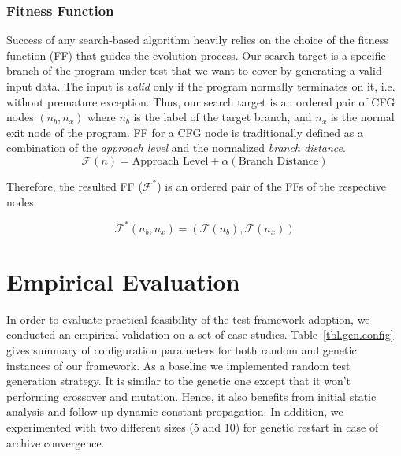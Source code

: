 \documentclass[sigconf]{acmart}
\begin{document}
\subsubsection{Fitness Function}
\label{sub.sub.sec.fitness.fun}

Success of any search-based algorithm heavily relies on the choice of the fitness function (FF) that guides the evolution process. Our search target is a specific branch of the program under test that we want to cover by generating a valid input data. The input is \emph{valid} only if the program normally terminates on it, i.e. without premature exception. Thus, our search target is an ordered pair of CFG nodes $(n_b, n_x)$ where $n_b$ is the label of the target branch, and $n_x$ is the normal exit node of the program. FF for a CFG node is traditionally defined as a combination of the \emph{approach level} and the normalized \emph{branch distance}\cite{arcuri2010does}. 
\[
\mathcal{F}(n) = \text{Approach Level} + \alpha({\text{Branch Distance}})
\]

Therefore, the resulted FF ($\mathcal{F}^*$) is an ordered pair of the FFs of the respective nodes.   

\[
\mathcal{F}^*(n_b, n_x) = (\mathcal{F}(n_b), \mathcal{F}(n_x))
\]

\section{Empirical Evaluation}
\label{sec.evaluation}

In order to evaluate practical feasibility of the test framework adoption, we conducted an empirical validation on a set of case studies. Table~\ref{tbl.gen.config} gives summary of configuration parameters for both random and genetic instances of our framework. As a baseline we implemented random test generation strategy. It is similar to the genetic one except that it won't performing crossover and mutation. Hence, it also benefits from initial static analysis and follow up dynamic constant propagation. In addition, we experimented with two different sizes (5 and 10) for genetic restart in case of archive convergence.
\end{document}
